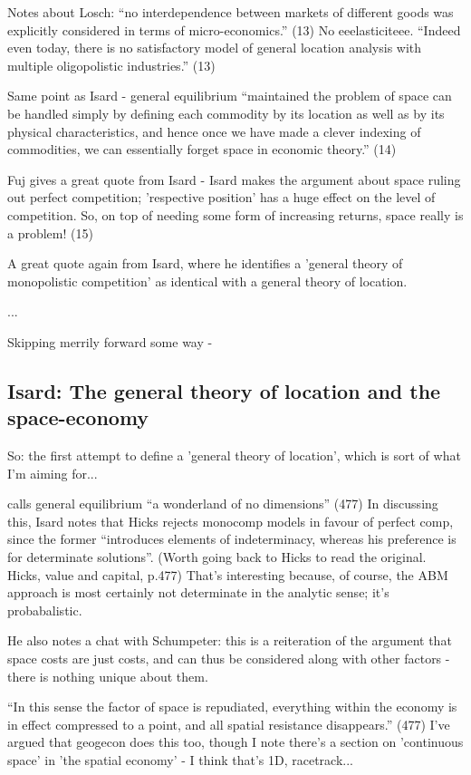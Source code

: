 Notes about Losch: ``no interdependence between markets of different goods was explicitly considered in terms of micro-economics.'' (13) No eeelasticiteee. ``Indeed even today, there is no satisfactory model of general location analysis with multiple oligopolistic industries.'' (13)

Same point as Isard - general equilibrium ``maintained the problem of space can be handled simply by defining each commodity by its location as well as by its physical characteristics, and hence once we have made a clever indexing of commodities, we can essentially forget space in economic theory.'' (14)

Fuj gives a great quote from Isard - Isard makes the argument about space ruling out perfect competition; 'respective position' has a huge effect on the level of competition. So, on top of needing some form of increasing returns, space really is a problem! (15)

A great quote again from Isard, where he identifies a 'general theory of monopolistic competition' as identical with a general theory of location.

...

Skipping merrily forward some way -




\subsection{Isard: The general theory of location and the space-economy}

So: the first attempt to define a 'general theory of location', which is sort of what I'm aiming for...

calls general equilibrium ``a wonderland of no dimensions'' (477) In discussing this, Isard notes that Hicks rejects monocomp models in favour of perfect comp, since the former ``introduces elements of indeterminacy, whereas his preference is for determinate solutions''. (Worth going back to Hicks to read the original. Hicks, value and capital, p.477) That's interesting because, of course, the ABM approach is most certainly not determinate in the analytic sense; it's probabalistic. 

He also notes a chat with Schumpeter: this is a reiteration of the argument that space costs are just costs, and can thus be considered along with other factors - there is nothing unique about them.

``In this sense the factor of space is repudiated, everything within the economy is in effect compressed to a point, and all spatial resistance disappears.'' (477) I've argued that geogecon does this too, though I note there's a section on 'continuous space' in 'the spatial economy' - I think that's 1D, racetrack...

